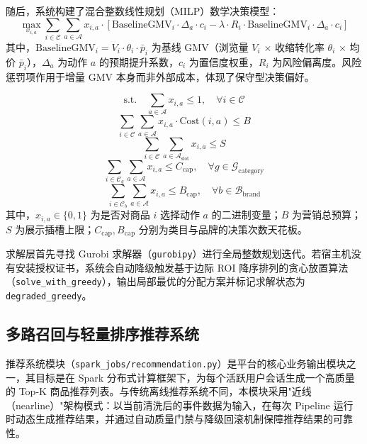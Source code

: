 随后，系统构建了混合整数线性规划（MILP）数学决策模型：
\begin{equation}
    \max_{x_{i,a}} \sum_{i \in \mathcal{C}} \sum_{a \in \mathcal{A}} x_{i,a} \cdot \left[ \text{BaselineGMV}_i \cdot \Delta_a \cdot c_i - \lambda \cdot R_i \cdot \text{BaselineGMV}_i \cdot \Delta_a \cdot c_i \right]
\end{equation}
其中，$\text{BaselineGMV}_i = V_i \cdot \theta_i \cdot \bar{p}_i$ 为基线 GMV（浏览量 $V_i$ $\times$ 收缩转化率 $\theta_i$ $\times$ 均价 $\bar{p}_i$），$\Delta_a$ 为动作 $a$ 的预期提升系数，$c_i$ 为置信度权重，$R_i$ 为风险偏离度。风险惩罚项作用于增量 GMV 本身而非外部成本，体现了保守型决策偏好。

\begin{equation}
    \text{s.t.} \quad \sum_{a \in \mathcal{A}} x_{i,a} \le 1, \quad \forall i \in \mathcal{C}
\end{equation}
\begin{equation}
    \sum_{i \in \mathcal{C}} \sum_{a \in \mathcal{A}} x_{i,a} \cdot \text{Cost}(i,a) \le B
\end{equation}
\begin{equation}
    \sum_{i \in \mathcal{C}} \sum_{a \in \mathcal{A}_{\text{slot}}} x_{i,a} \le S
\end{equation}
\begin{equation}
    \sum_{i \in \mathcal{C}_g} \sum_{a \in \mathcal{A}} x_{i,a} \le C_{\text{cap}}, \quad \forall g \in \mathcal{G}_{\text{category}}
\end{equation}
\begin{equation}
    \sum_{i \in \mathcal{C}_b} \sum_{a \in \mathcal{A}} x_{i,a} \le B_{\text{cap}}, \quad \forall b \in \mathcal{B}_{\text{brand}}
\end{equation}
其中，$x_{i, a} \in \{0, 1\}$ 为是否对商品 $i$ 选择动作 $a$ 的二进制变量；$B$ 为营销总预算；$S$ 为展示插槽上限；$C_{\text{cap}}, B_{\text{cap}}$ 分别为类目与品牌的决策次数天花板。

求解层首先寻找 Gurobi 求解器（\texttt{gurobipy}）进行全局整数规划迭代。若宿主机没有安装授权证书，系统会自动降级触发基于边际 ROI 降序排列的贪心放置算法（\texttt{solve\_with\_greedy}），输出局部最优的分配方案并标记求解状态为 \texttt{degraded\_greedy}。

\subsection{多路召回与轻量排序推荐系统}

推荐系统模块（\texttt{spark\_jobs/recommendation.py}）是平台的核心业务输出模块之一，其目标是在 Spark 分布式计算框架下，为每个活跃用户会话生成一个高质量的 Top-K 商品推荐列表。与传统离线推荐系统不同，本模块采用"近线（nearline）"架构模式：以当前清洗后的事件数据为输入，在每次 Pipeline 运行时动态生成推荐结果，并通过自动质量门禁与降级回滚机制保障推荐结果的可靠性。

